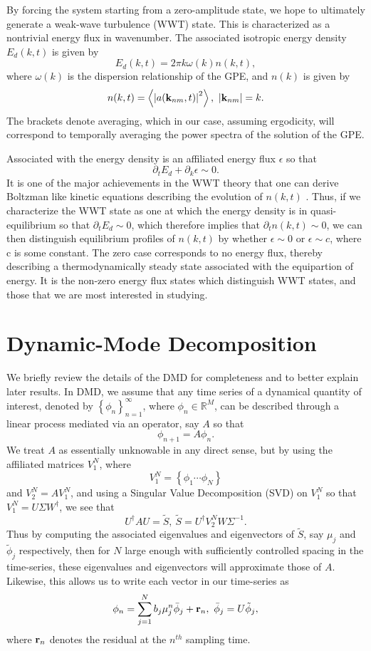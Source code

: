 \documentclass[a4paper,11pt]{article}
\newcommand{\pd}{\partial}
\newcommand{\bk}{{\bf k}}
\begin{document}
By forcing the system starting from a zero-amplitude state, we hope to ultimately generate a weak-wave turbulence (WWT) state.  This is characterized as a nontrivial energy flux in wavenumber.  The associated isotropic energy density $E_{d}(k,t)$ is given by 
\[
E_{d}(k,t) = 2\pi k\omega(k)n(k,t), 
\]
where $\omega(k)$ is the dispersion relationship of the GPE, and $n(k)$ is given by 
\[
n(k,t) = \left< \left|a(\bk_{nm},t)\right|^{2}\right>, ~ \left|\bk_{nm}\right| = k.
\]
The brackets denote averaging, which in our case, assuming ergodicity, will correspond to temporally averaging the power spectra of the solution of the GPE.  

Associated with the energy density is an affiliated energy flux $\epsilon$ so that 
\[
\pd_{t} E_{d} + \pd_{k}\epsilon \sim 0.
\]
It is one of the major achievements in the WWT theory that one can derive Boltzman like kinetic equations describing the evolution of $n(k,t)$ \cite{nazarenko}.  Thus, if we characterize the WWT state as one at which the energy density is in quasi-equilibrium so that $\pd_{t}E_{d}\sim 0$, which therefore implies that $\pd_{t}n(k,t)\sim 0$, we can then distinguish equilibrium profiles of $n(k,t)$ by whether $\epsilon \sim 0$ or $\epsilon \sim c$, where c is some constant.  The zero case corresponds to no energy flux, thereby describing a thermodynamically steady state associated with the equipartion of energy.  It is the non-zero energy flux states which distinguish WWT states, and those that we are most interested in studying.  

\section*{Dynamic-Mode Decomposition}
We briefly review the details of the DMD for completeness and to better explain later results.  In DMD, we assume that any time series of a dynamical quantity of interest, denoted by $\left\{\phi_{n}\right\}_{n=1}^{\infty}$, where $\phi_{n}\in \mathbb{R}^{M}$, can be described through a linear process mediated via an operator, say $A$ so that 
\[
\phi_{n+1} = A \phi_{n}.  
\] 
We treat $A$ as essentially unknowable in any direct sense, but by using the affiliated matrices $V_{1}^{N}$, where
\[
V^{N}_{1} = \left\{\phi_{1} \cdots \phi_{N} \right\}
\]
and $V_{2}^{N} = AV_{1}^{N}$, and using a Singular Value Decomposition (SVD) on $V_{1}^{N}$ so that $V_{1}^{N} = U\Sigma W^{\dagger}$, we see that 
\[
U^{\dagger}AU = \tilde{S}, ~ \tilde{S} = U^{\dagger}V_{2}^{N}W\Sigma^{-1}.
\]
Thus by computing the associated eigenvalues and eigenvectors of $\tilde{S}$, say $\mu_{j}$ and $\tilde{\phi}_{j}$ respectively, then for $N$ large enough with sufficiently controlled spacing in the time-series, these eigenvalues and eigenvectors will approximate those of $A$.  Likewise, this allows us to write each vector in our time-series as 
\[
\phi_{n} = \sum_{j=1}^{N} b_{j}\mu_{j}^{n} \bar{\phi}_{j} + {\bf r}_{n}, ~ \bar{\phi}_{j} = U \tilde{\phi}_{j},
\]
where ${\bf r}_{n}$ denotes the residual at the $n^{th}$ sampling time. 
\end{document}
